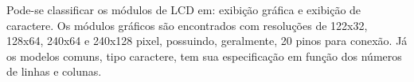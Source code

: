 Pode-se classificar os módulos de LCD em: exibição gráfica e exibição de caractere. Os módulos gráficos são encontrados com resoluções de 122x32, 128x64, 240x64 e 240x128 pixel, possuindo, geralmente, 20 pinos para conexão. Já os modelos comuns, tipo caractere, tem sua especificação em função dos números de linhas e colunas.